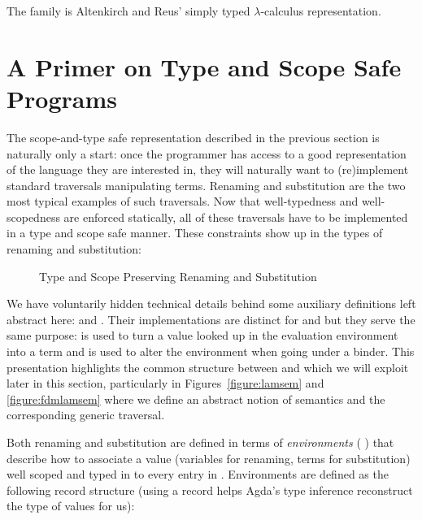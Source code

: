 The   family  is Altenkirch
and Reus' simply typed $\lambda$-calculus representation.




\section{A Primer on Type and Scope Safe Programs}\label{section:primer-program}

The scope-and-type safe representation described in the previous section is
naturally only a start: once the programmer has access to a good
representation of the language they are interested in, they will naturally
want to (re)implement standard traversals manipulating terms.
Renaming and substitution are the two most typical examples
of such traversals. Now that well-typedness and well-scopedness are enforced
statically, all of these traversals have to be implemented
in a type and scope safe manner.
These constraints show up in the types of renaming and substitution: %

\begin{figure}[h]
\begin{minipage}{0.50\textwidth}
\end{minipage}\hfill
\begin{minipage}{0.50\textwidth}
\end{minipage}
\caption{Type and Scope Preserving Renaming and Substitution}
\end{figure}

We have voluntarily hidden technical details behind some auxiliary definitions
left abstract here:  and . Their implementations are distinct
for  and  but they serve the same purpose:  is used to
turn a value looked up in the evaluation environment into a term and 
is used to alter the environment when going under a binder. This presentation
highlights the common structure between  and  which we will exploit
later in this section, particularly in Figures~\ref{figure:lamsem} and \ref{figure:fdmlamsem}
where we define an abstract notion of semantics and the corresponding generic traversal.

Both renaming and substitution are defined in terms of \emph{environments}
{( )  } that describe how to associate a value 
(variables for renaming, terms for substitution) well scoped and typed in 
to every entry in . Environments are defined as the following record
structure (using a record helps Agda's type inference reconstruct the type of
values  for us):


